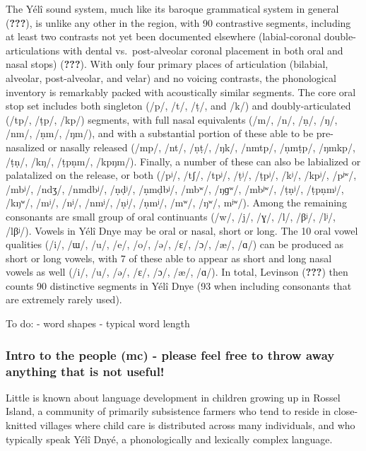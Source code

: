 \documentclass[english,,man,floatsintext]{apa6}
\begin{document}
The Yélî sound system, much like its baroque grammatical system in
general ({\textbf{???}}), is unlike any other in the region, with 90
contrastive segments, including at least two contrasts not yet been
documented elsewhere (labial-coronal double-articulations with dental
vs.~post-alveolar coronal placement in both oral and nasal stops)
({\textbf{???}}). With only four primary places of articulation
(bilabial, alveolar, post-alveolar, and velar) and no voicing contrasts,
the phonological inventory is remarkably packed with acoustically
similar segments. The core oral stop set includes both singleton (/p/,
/t/, /ṭ/, and /k/) and doubly-articulated (/tp/, /ṭp/, /kp/) segments,
with full nasal equivalents (/m/, /n/, /ṇ/, /ŋ/, /nm/, /ṇm/, /ŋm/), and
with a substantial portion of these able to be pre-nasalized or nasally
released (/mp/, /nt/, /ṇṭ/, /ŋk/, /nmtp/, /ṇmṭp/, /ŋmkp/, /ṭṇ/, /kŋ/,
/ṭpṇm/, /kpŋm/). Finally, a number of these can also be labialized or
palatalized on the release, or both (/pʲ/, /tʃ/, /tpʲ/, /ṭʲ/, /ṭpʲ/,
/kʲ/, /kpʲ/, /pʲʷ/, /mbʲ/, /ndʒ/, /nmdbʲ/, /ṇḍʲ/, /ṇmḍbʲ/, /mbʷ/, /ŋɡʷ/,
/mbʲʷ/, /ṭṇʲ/, /ṭpṇmʲ/, /kŋʷ/, /mʲ/, /nʲ/, /nmʲ/, /ṇʲ/, /ṇmʲ/, /mʷ/,
/ŋʷ/, mʲʷ/). Among the remaining consonants are small group of oral
continuants (/w/, /j/, /ɣ/, /l/, /βʲ/, /lʲ/, /lβʲ/). Vowels in Yélî Dnye
may be oral or nasal, short or long. The 10 oral vowel qualities (/i/,
/ɯ/, /u/, /e/, /o/, /ə/, /ɛ/, /ɔ/, /æ/, /ɑ/) can be produced as short or
long vowels, with 7 of these able to appear as short and long nasal
vowels as well (/i/, /u/, /ə/, /ɛ/, /ɔ/, /æ/, /ɑ/). In total, Levinson
({\textbf{???}}) then counts 90 distinctive segments in Yélî Dnye (93
when including consonants that are extremely rarely used).

To do: - word shapes - typical word length

\subsubsection{\texorpdfstring{Intro to the people (\textbf{mc}) -
please feel free to throw away anything that is not
useful!}{Intro to the people (mc) - please feel free to throw away anything that is not useful!}}\label{intro-to-the-people-mc---please-feel-free-to-throw-away-anything-that-is-not-useful}

Little is known about language development in children growing up in
Rossel Island, a community of primarily subsistence farmers who tend to
reside in close-knitted villages where child care is distributed across
many individuals, and who typically speak Yélî Dnyé, a phonologically
and lexically complex language.
\end{document}
